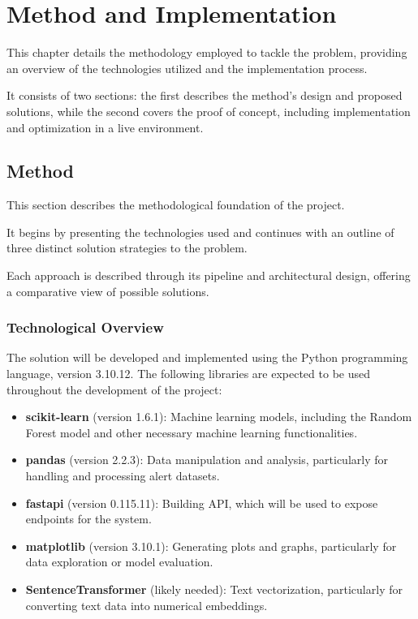 \chapter{Method and Implementation}
\label{chap:Chapter3}

This chapter details the methodology employed to tackle the problem, providing an overview of the technologies utilized and the implementation process. 

It consists of two sections: the first describes the method's design and proposed solutions, while the second covers the proof of concept, including implementation and optimization in a live environment.

\section{Method}
This section describes the methodological foundation of the project. 

It begins by presenting the technologies used and continues with an outline of three distinct solution strategies to the problem. 

Each approach is described through its pipeline and architectural design, offering a comparative view of possible solutions.

\subsection{Technological Overview}

The solution will be developed and implemented using the Python programming language, version 3.10.12. 
The following libraries are expected to be used throughout the development of the project:

\begin{itemize}
    \item \textbf{scikit-learn} (version 1.6.1): Machine learning models, including the Random Forest model and other necessary machine learning functionalities.
    \item \textbf{pandas} (version 2.2.3): Data manipulation and analysis, particularly for handling and processing alert datasets.
    \item \textbf{fastapi} (version 0.115.11): Building API, which will be used to expose endpoints for the system.
    \item \textbf{matplotlib} (version 3.10.1): Generating plots and graphs, particularly for data exploration or model evaluation.
    \item \textbf{SentenceTransformer} (likely needed): Text vectorization, particularly for converting text data into numerical embeddings.
\end{itemize}

